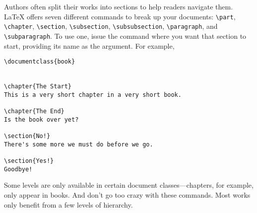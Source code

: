 Authors often split their works into sections to help readers navigate them.
\LaTeX{} offers seven different commands to break up your documents:
\verb|\part|, \verb|\chapter|, \verb|\section|, \verb|\subsection|,
\verb|\subsubsection|, \verb|\paragraph|, and \verb|\subparagraph|.
To use one, issue the command where you want that section to start,
providing its name as the argument.
For example,
\begin{leftfigure}
\begin{lstlisting}
\documentclass{book}


\chapter{The Start}
This is a very short chapter in a very short book.

\chapter{The End}
Is the book over yet?

\section{No!}
There's some more we must do before we go.

\section{Yes!}
Goodbye!

\end{lstlisting}
\end{leftfigure}
Some levels are only available in certain document classes---chapters,
for example, only appear in books.
And don't go too crazy with these commands.
Most works only benefit from a few levels of hierarchy.

